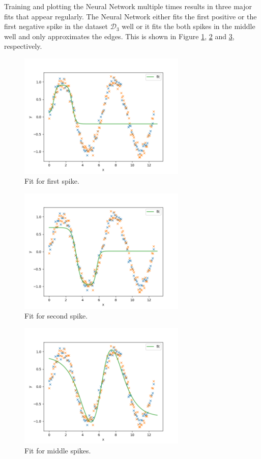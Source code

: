 \documentclass{support/acm_proc_article-sp}
\begin{document}
    Training and plotting the Neural Network multiple times results in three major fits that appear regularly.
    The Neural Network either fits the first positive or the first negative spike in the dataset $\mathcal{D}_3$ well
    or it fits the both spikes in the middle well and only approximates the edges.
    This is shown in Figure \ref{fig:nn-first-spike}, \ref{fig:nn-second-spike} and \ref{fig:nn-middle-spikes}, respectively.

    \begin{figure}[!htbp]
        \centering
        \includegraphics[width=8cm]{images/nn-first-spike.png}
        \caption{Fit for first spike.}
        \label{fig:nn-first-spike}
    \end{figure}

    \begin{figure}[!htbp]
        \centering
        \includegraphics[width=8cm]{images/nn-second-spike.png}
        \caption{Fit for second spike.}
        \label{fig:nn-second-spike}
    \end{figure}

    \begin{figure}[!htbp]
        \centering
        \includegraphics[width=8cm]{images/nn-middle-spikes.png}
        \caption{Fit for middle spikes.}
        \label{fig:nn-middle-spikes}
    \end{figure}
\end{document}
